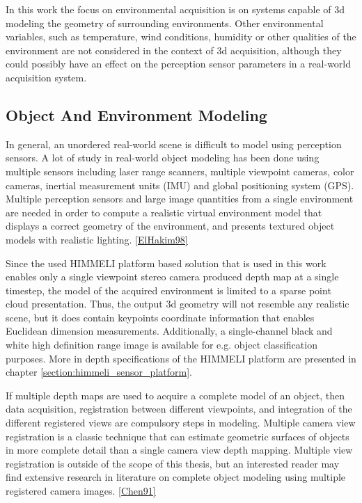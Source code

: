 \documentclass[12pt,a4paper,oneside,pdftex]{report}
\begin{document}
{In this work the focus on environmental acquisition is on systems capable of 3d modeling the geometry of surrounding environments. Other environmental variables, such as temperature, wind conditions, humidity or other qualities of the environment are not considered in the context of 3d acquisition, although they could possibly have an effect on the perception sensor parameters in a real-world acquisition system. 

\subsection{Object And Environment Modeling}

In general, an unordered real-world scene is difficult to model using perception sensors. A lot of study in real-world object modeling has been done using multiple sensors including laser range scanners, multiple viewpoint cameras, color cameras, inertial measurement units (IMU) and global positioning system (GPS). Multiple perception sensors and large image quantities from a single environment are needed in order to compute a realistic virtual environment model that displays a correct geometry of the environment, and presents textured object models with realistic lighting. \ref{ElHakim98}



Since the used HIMMELI platform based solution that is used in this work enables only a single viewpoint stereo camera produced depth map at a single timestep, the model of the acquired environment is limited to a sparse point cloud presentation. Thus, the output 3d geometry will not resemble any realistic scene, but it does contain keypoints coordinate information that enables Euclidean dimension measurements. Additionally, a single-channel black and white high definition range image is available for e.g. object classification purposes. More in depth specifications of the HIMMELI platform are presented in chapter \ref{section:himmeli_sensor_platform}.

If multiple depth maps are used to acquire a complete model of an object, then data acquisition, registration between different viewpoints, and integration of the different registered views are compulsory steps in modeling.  Multiple camera view registration is a classic technique that can estimate geometric surfaces of objects in more complete detail than a single camera view depth mapping. Multiple view registration is outside of the scope of this thesis, but an interested reader may find extensive research in literature on complete object modeling using multiple registered camera images.  \ref{Chen91}

}
\end{document}
